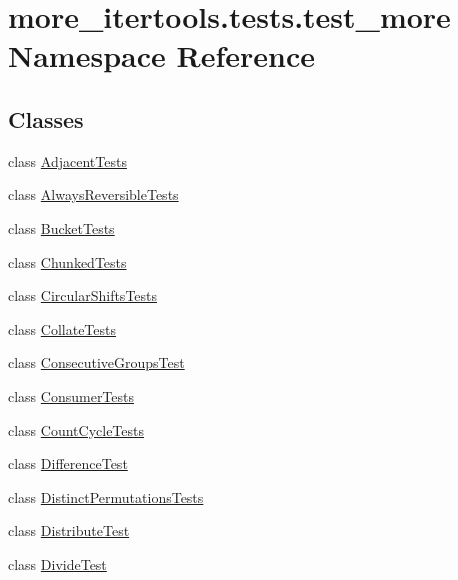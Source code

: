 \hypertarget{namespacemore__itertools_1_1tests_1_1test__more}{}\section{more\+\_\+itertools.\+tests.\+test\+\_\+more Namespace Reference}
\label{namespacemore__itertools_1_1tests_1_1test__more}
\subsection*{Classes}
\begin{DoxyCompactItemize}
\item 
class \hyperlink{classmore__itertools_1_1tests_1_1test__more_1_1_adjacent_tests}{Adjacent\+Tests}
\item 
class \hyperlink{classmore__itertools_1_1tests_1_1test__more_1_1_always_reversible_tests}{Always\+Reversible\+Tests}
\item 
class \hyperlink{classmore__itertools_1_1tests_1_1test__more_1_1_bucket_tests}{Bucket\+Tests}
\item 
class \hyperlink{classmore__itertools_1_1tests_1_1test__more_1_1_chunked_tests}{Chunked\+Tests}
\item 
class \hyperlink{classmore__itertools_1_1tests_1_1test__more_1_1_circular_shifts_tests}{Circular\+Shifts\+Tests}
\item 
class \hyperlink{classmore__itertools_1_1tests_1_1test__more_1_1_collate_tests}{Collate\+Tests}
\item 
class \hyperlink{classmore__itertools_1_1tests_1_1test__more_1_1_consecutive_groups_test}{Consecutive\+Groups\+Test}
\item 
class \hyperlink{classmore__itertools_1_1tests_1_1test__more_1_1_consumer_tests}{Consumer\+Tests}
\item 
class \hyperlink{classmore__itertools_1_1tests_1_1test__more_1_1_count_cycle_tests}{Count\+Cycle\+Tests}
\item 
class \hyperlink{classmore__itertools_1_1tests_1_1test__more_1_1_difference_test}{Difference\+Test}
\item 
class \hyperlink{classmore__itertools_1_1tests_1_1test__more_1_1_distinct_permutations_tests}{Distinct\+Permutations\+Tests}
\item 
class \hyperlink{classmore__itertools_1_1tests_1_1test__more_1_1_distribute_test}{Distribute\+Test}
\item 
class \hyperlink{classmore__itertools_1_1tests_1_1test__more_1_1_divide_test}{Divide\+Test}

\end{DoxyCompactItemize}
